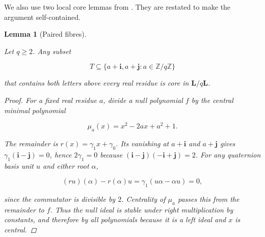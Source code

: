 \documentclass[11pt]{article}
\newtheorem{lemma}[theorem]{Lemma}
\numberwithin{equation}{section}
\begin{document}
We also use two local core lemmas from \cite{carptopus2026}. They are restated to make the
argument self-contained.

\begin{lemma}[Paired fibres]
\label{lem:paired}

Let $q\ge2$. Any subset

\[
T\subseteq
\{a+\mathbf i,a+\mathbf j:a\in\mathbb Z/q\mathbb Z\}
\]

that contains both letters above every real residue is core in
$\mathbf L/q\mathbf L$.

\begin{proof}

For a fixed real residue $a$, divide a null polynomial $f$ by the central
minimal polynomial

\[
\mu_a(x)=x^2-2ax+a^2+1.
\]

The remainder is $r(x)=\gamma_1x+\gamma_0$. Its vanishing at
$a+\mathbf i$ and $a+\mathbf j$ gives
$\gamma_1(\mathbf i-\mathbf j)=0$, hence $2\gamma_1=0$ because
$(\mathbf i-\mathbf j)(-\mathbf i+\mathbf j)=2$. For any quaternion basis
unit $u$ and either root $\alpha$,

\[
(ru)(\alpha)-r(\alpha)u
=\gamma_1(u\alpha-\alpha u)=0,
\]

since the commutator is divisible by $2$. Centrality of $\mu_a$ passes this
from the remainder to $f$. Thus the null ideal is stable under right
multiplication by constants, and therefore by all polynomials because it is
a left ideal and $x$ is central.
\end{proof}

\end{lemma}
\end{document}
